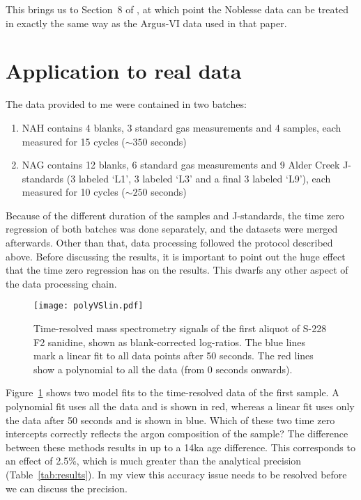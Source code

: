 \documentclass{article}
\begin{document}
This brings us to Section~8 of \citep{vermeesch2015b}, at which point
the Noblesse data can be treated in exactly the same way as the
Argus-VI data used in that paper.

\section{Application to real data}

The data provided to me were contained in two batches:

\begin{enumerate}
\item NAH contains 4 blanks, 3 standard gas measurements and 4
  samples, each measured for 15 cycles ($\sim 350$ seconds)
\item NAG contains 12 blanks, 6 standard gas measurements and 9 Alder
  Creek J-standards (3 labeled `L1', 3 labeled `L3' and a final 3
  labeled `L9'), each measured for 10 cycles ($\sim 250$ seconds)
\end{enumerate}

Because of the different duration of the samples and J-standards, the
time zero regression of both batches was done separately, and the
datasets were merged afterwards. Other than that, data processing
followed the protocol described above.  Before discussing the results,
it is important to point out the huge effect that the time zero
regression has on the results. This dwarfs any other aspect of the
data processing chain.

\begin{figure}[!ht]
  \centering
  \texttt{[image: polyVSlin.pdf]}
  \caption{Time-resolved mass spectrometry signals of the first
    aliquot of S-228 F2 sanidine, shown as blank-corrected log-ratios.
    The blue lines mark a linear fit to all data points after 50
    seconds.  The red lines show a polynomial to all the data (from 0
    seconds onwards).}
  \label{fig:polyVSlin}
\end{figure}

Figure~\ref{fig:polyVSlin} shows two model fits to the time-resolved
data of the first sample. A polynomial fit uses all the data and is
shown in red, whereas a linear fit uses only the data after 50 seconds
and is shown in blue. Which of these two time zero intercepts
correctly reflects the argon composition of the sample? The difference
between these methods results in up to a 14ka age difference. This
corresponds to an effect of 2.5\%, which is much greater than the
analytical precision (Table~\ref{tab:results}).  In my view this
accuracy issue needs to be resolved before we can discuss the
precision.\\
\end{document}
